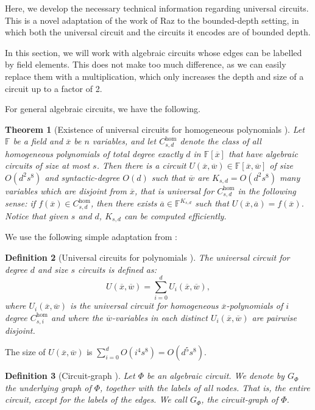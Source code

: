 \documentclass[11pt,letter]{article}
\newtheorem{theorem}{Theorem}[section]
\newtheorem{definition}[theorem]{Definition}
\theoremstyle{remark} %
\begin{document}
{    Here, we develop the necessary technical information regarding universal circuits. This is a novel adaptation of the work of Raz \cite{Raz10} to the bounded-depth setting, in which both the universal circuit and the circuits it encodes are of bounded depth.

    In this section, we will work with algebraic circuits whose edges can be labelled by field elements. This does not make too much difference, as we can easily replace them with a multiplication, which only increases the depth and size of a circuit up to a factor of 2.
    
    For general algebraic circuits, we have the following. 

    \begin{theorem}[Existence of universal circuits for homogeneous polynomials \cite{Raz10}]
        \label{theorem: Existence of universal circuits for homogeneous polynomials}
        Let $\mathbb{F}$ be a field and $\overline{x}$ be $n$ variables, and let $C_{s,d}^{\hom}$ denote the class of all homogeneous polynomials of total degree exactly $d$ in $\mathbb{F}[\overline{x}]$ that have algebraic circuits of size at most $s$. Then there is a circuit $U(\overline{x},\overline{w}) \in \mathbb{F}[\overline{x},\overline{w}]$ of size $O(d^2 s^8)$ and syntactic-degree $O(d)$ such that $\overline{w}$ are $K_{s,d} = O(d^2 s^8)$ many variables which are disjoint from $\overline{x}$, that is universal for $C_{s,d}^{\hom}$ in the following sense: if $f(\overline{x}) \in C_{s,d}^{\hom}$, then there exists $\overline{a} \in \mathbb{F}^{K_{s,d}}$ such that $U(\overline{x},\overline{a})=f(\overline{x})$. Notice that given $s$ and $d$, $K_{s,d}$ can be computed efficiently.
    \end{theorem}

    We use the following simple adaptation from \cite{ST25}:
    \begin{definition}[Universal circuits for polynomials \cite{ST25}]  
        The universal circuit for degree $d$ and size $s$ circuits is defined as:
        \begin{equation*}
            U(\overline{x},\overline{w})=\sum_{i=0}^d U_i(\overline{x},\overline{w}),
        \end{equation*}
        where $U_i(\overline{x},\overline{w})$ is the universal circuit for homogeneous $\overline{x}$-polynomials of $i$ degree $C_{s,i}^{\hom}$ and where the $\overline{w}$-variables in each distinct $U_i(\overline{x},\overline{w})$ are pairwise disjoint.
    \end{definition}
    The size of $U(\overline{x},\overline{w})$ is $\sum_{i=0}^d O(i^4s^8)=O(d^5s^8)$.\par
    \begin{definition}[Circuit-graph \cite{Raz10}]
        Let $\Phi$ be an algebraic circuit. We denote by $G_\Phi$ the underlying graph of $\Phi$, together with the labels of all nodes. That is, the entire circuit, except for the labels of the edges. We call $G_\Phi$, the circuit-graph of $\Phi$.
    \end{definition}

}
\end{document}
